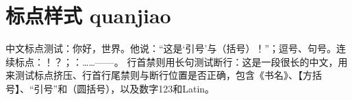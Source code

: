 \documentclass[a4paper,10pt,UTF8,scheme=chinese]{ctexart}
\begin{document}
\section{标点样式 quanjiao}
中文标点测试：你好，世界。他说：“这是‘引号’与（括号）！”；逗号、句号。连续标点：！？；：……——。
行首禁则用长句测试断行：这是一段很长的中文，用来测试标点挤压、行首行尾禁则与断行位置是否正确，包含《书名》、【方括号】、“引号”和（圆括号），以及数字123和Latin。
\end{document}
